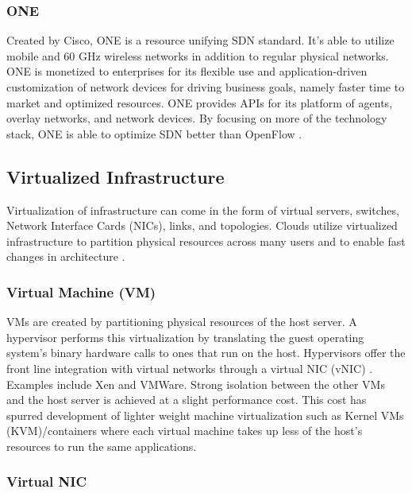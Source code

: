 \documentclass[12pt]{article}
\begin{document}
\subsubsection{ONE}

Created by Cisco, ONE \cite{ciscoone} is a resource unifying SDN standard. It's able to utilize mobile and 60 GHz wireless networks in addition to regular physical networks. ONE is monetized to enterprises for its flexible use and application-driven customization of network devices for driving business goals, namely faster time to market and optimized resources. ONE provides APIs for its platform of agents, overlay networks, and network devices. By focusing on more of the technology stack, ONE is able to optimize SDN better than OpenFlow \cite{wang2015survey}.



\subsection{Virtualized Infrastructure}

Virtualization of infrastructure can come in the form of virtual servers, switches, Network Interface Cards (NICs), links, and topologies. Clouds utilize virtualized infrastructure to partition physical resources across many users and to enable fast changes in architecture \cite{wang2015survey}.


\subsubsection{Virtual Machine (VM)}

VMs are created by partitioning physical resources of the host server. A hypervisor performs this virtualization by translating the guest operating system's binary hardware calls to ones that run on the host. Hypervisors offer the front line integration with virtual networks through a virtual NIC (vNIC) \cite{wang2015survey}. Examples include Xen and VMWare. Strong isolation between the other VMs and the host server is achieved at a slight performance cost. This cost has spurred development of lighter weight machine virtualization such as Kernel VMs (KVM)/containers \cite{oci,docker} where each virtual machine takes up less of the host's resources to run the same applications.

\subsubsection{Virtual NIC}
\end{document}

